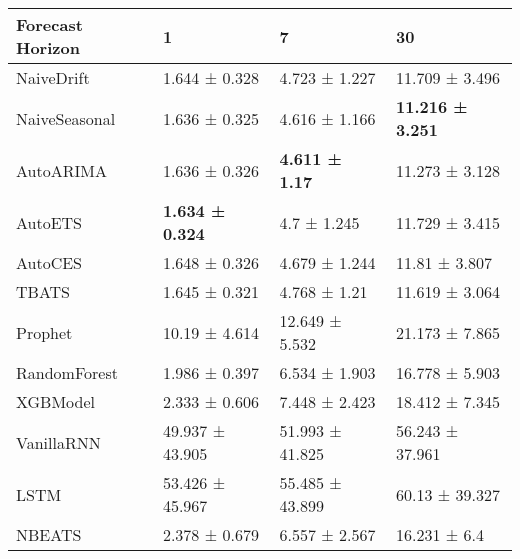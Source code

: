 \begin{tabular}{llll}
\toprule
Forecast Horizon & 1 & 7 & 30 \\
\midrule
NaiveDrift & 1.644 ± 0.328 & 4.723 ± 1.227 & 11.709 ± 3.496 \\
NaiveSeasonal & 1.636 ± 0.325 & 4.616 ± 1.166 & \textbf{11.216 ± 3.251} \\
AutoARIMA & 1.636 ± 0.326 & \textbf{4.611 ± 1.17} & 11.273 ± 3.128 \\
AutoETS & \textbf{1.634 ± 0.324} & 4.7 ± 1.245 & 11.729 ± 3.415 \\
AutoCES & 1.648 ± 0.326 & 4.679 ± 1.244 & 11.81 ± 3.807 \\
TBATS & 1.645 ± 0.321 & 4.768 ± 1.21 & 11.619 ± 3.064 \\
Prophet & 10.19 ± 4.614 & 12.649 ± 5.532 & 21.173 ± 7.865 \\
RandomForest & 1.986 ± 0.397 & 6.534 ± 1.903 & 16.778 ± 5.903 \\
XGBModel & 2.333 ± 0.606 & 7.448 ± 2.423 & 18.412 ± 7.345 \\
VanillaRNN & 49.937 ± 43.905 & 51.993 ± 41.825 & 56.243 ± 37.961 \\
LSTM & 53.426 ± 45.967 & 55.485 ± 43.899 & 60.13 ± 39.327 \\
NBEATS & 2.378 ± 0.679 & 6.557 ± 2.567 & 16.231 ± 6.4 \\
\bottomrule
\end{tabular}
